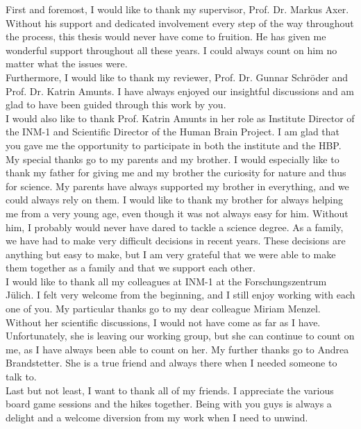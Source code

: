 \label{sec:acknowledgement}
%
First and foremost, I would like to thank my supervisor, Prof. Dr. Markus Axer.
Without his support and dedicated involvement every step of the way throughout the process, this thesis would never have come to fruition.
He has given me wonderful support throughout all these years.
I could always count on him no matter what the issues were.
\\
%
Furthermore, I would like to thank my reviewer, Prof. Dr. Gunnar Schr{\"o}der and Prof. Dr. Katrin Amunts.
I have always enjoyed our insightful discussions and am glad to have been guided through this work by you.
\\
%
I would also like to thank Prof. Katrin Amunts in her role as Institute Director of the INM-1 and Scientific Director of the Human Brain Project.
I am glad that you gave me the opportunity to participate in both the institute and the HBP.
\\
%
My special thanks go to my parents and my brother.
I would especially like to thank my father for giving me and my brother the curiosity for nature and thus for science.
My parents have always supported my brother in everything, and we could always rely on them.
I would like to thank my brother for always helping me from a very young age, even though it was not always easy for him.
Without him, I probably would never have dared to tackle a science degree.
As a family, we have had to make very difficult decisions in recent years.
These decisions are anything but easy to make, but I am very grateful that we were able to make them together as a family and that we support each other.
\\
%
I would like to thank all my colleagues at INM-1 at the Forschungszentrum J{\"u}lich.
I felt very welcome from the beginning, and I still enjoy working with each one of you.
My particular thanks go to my dear colleague Miriam Menzel.
Without her scientific discussions, I would not have come as far as I have.
Unfortunately, she is leaving our working group, but she can continue to count on me, as I have always been able to count on her.
My further thanks go to Andrea Brandstetter.
She is a true friend and always there when I needed someone to talk to.
\\
%
Last but not least, I want to thank all of my friends.
I appreciate the various board game sessions and the hikes together.
Being with you guys is always a delight and a welcome diversion from my work when I need to unwind. 
% 
% 
% 
\newpage
\pagestyle{empty}
\hfill
\vfill
